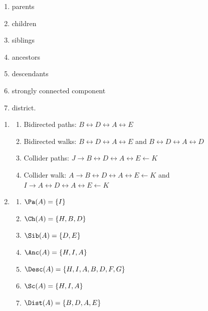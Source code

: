 \begin{enumerate}
\begin{enumerate}
        \begin{enumerate}
            \item parents
            \item children
            \item siblings
            \item ancestors
            \item descendants
            \item strongly connected component
            \item district.
        \end{enumerate}
    \end{enumerate}

    \begin{ungradedsolution}
        \begin{enumerate}
            \item
            \begin{enumerate}
                \item Bidirected paths: $B\leftrightarrow D \leftrightarrow A \leftrightarrow E$
                \item Bidirected walks: $B\leftrightarrow D \leftrightarrow A \leftrightarrow E$ and $B\leftrightarrow D \leftrightarrow A \leftrightarrow D$
                \item Collider paths: $J \rightarrow B \leftrightarrow D \leftrightarrow A \leftrightarrow E \leftarrow K$
                \item Collider walk: $A \rightarrow B\leftrightarrow D \leftrightarrow A \leftrightarrow E \leftarrow K$ and $I \rightarrow A \leftrightarrow D \leftrightarrow A \leftrightarrow E \leftarrow K$
            \end{enumerate}
            \item
            \begin{enumerate}
                \item $\Pa(A) = \{I\}$
                \item $\Ch(A) = \{H, B, D\}$
                \item $\Sib(A) = \{D, E\}$
                \item $\Anc(A) = \{H, I, A\}$
                \item $\Desc(A) = \{H, I, A, B, D, F, G\}$
                \item $\Sc(A) = \{H, I, A\}$
                \item $\Dist(A) = \{B, D, A, E\}$
            \end{enumerate}
        \end{enumerate}
    \end{ungradedsolution}


\end{enumerate}

